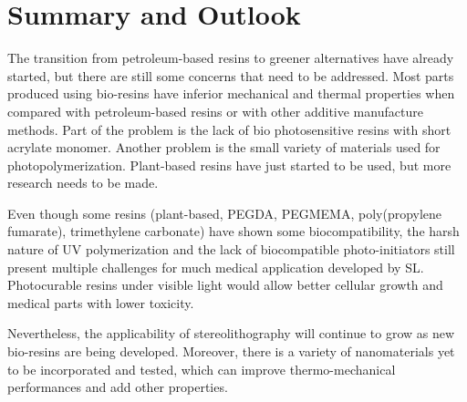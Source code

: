 \section{Summary and Outlook}

The transition from petroleum-based resins to greener alternatives have already started, but there are still some concerns that need to be addressed. Most parts produced using bio-resins have inferior mechanical and thermal properties when compared with petroleum-based resins or with other additive manufacture methods. Part of the problem is the lack of bio photosensitive resins with short acrylate monomer. Another problem is the small variety of materials used for photopolymerization. Plant-based resins have just started to be used, but more research needs to be made.

Even though some resins (plant-based, PEGDA, PEGMEMA, poly(propylene fumarate), trimethylene carbonate) have shown some biocompatibility, the harsh nature of UV polymerization and the lack of biocompatible photo-initiators still present multiple challenges for much medical application developed by SL. Photocurable resins under visible light would allow better cellular growth and medical parts with lower toxicity.

Nevertheless, the applicability of stereolithography will continue to grow as new bio-resins are being developed. Moreover, there is a variety of nanomaterials yet to be incorporated and tested, which can improve thermo-mechanical performances and add other properties.